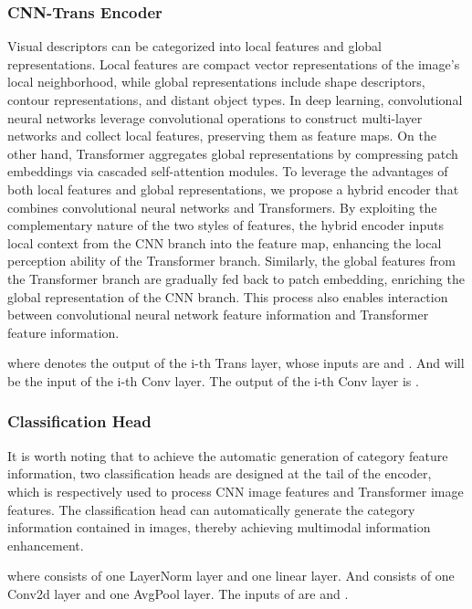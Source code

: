 \documentclass[sigconf,natbib=false]{acmart}
\begin{document}
\subsubsection{CNN-Trans Encoder}
Visual descriptors can be categorized into local features and global representations. Local features are compact vector representations of the image's local neighborhood, while global representations include shape descriptors, contour representations, and distant object types. In deep learning, convolutional neural networks leverage convolutional operations to construct multi-layer networks and collect local features, preserving them as feature maps. On the other hand, Transformer aggregates global representations by compressing patch embeddings via cascaded self-attention modules. To leverage the advantages of both local features and global representations, we propose a hybrid encoder that combines convolutional neural networks and Transformers. By exploiting the complementary nature of the two styles of features, the hybrid encoder inputs local context from the CNN branch into the feature map, enhancing the local perception ability of the Transformer branch. Similarly, the global features from the Transformer branch are gradually fed back to patch embedding, enriching the global representation of the CNN branch. This process also enables interaction between convolutional neural network feature information and Transformer feature information.

where  denotes the output of the i-th Trans layer, whose inputs are  and . And  will be the input of the i-th Conv layer. The output of the i-th Conv layer is .

\subsubsection{Classification Head}
It is worth noting that to achieve the automatic generation of category feature information, two classification heads are designed at the tail of the encoder, which is respectively used to process CNN image features and Transformer image features. The classification head can automatically generate the category information contained in images, thereby achieving multimodal information enhancement.

where  consists of one LayerNorm layer and one linear layer. And  consists of one Conv2d layer and one AvgPool layer. The inputs of  are  and .
\end{document}
